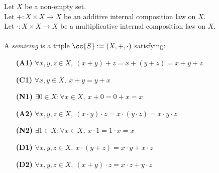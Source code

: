 \begin{definition-pre}[Semiring]
    \label{def:semiring}
    Let \(X\) be a non-empty set. \\
    Let \(+: X\times X \to X\) be an additive internal composition law on \(X\). \\
    Let \(\cdot: X\times X \to X\) be a multiplicative internal composition law on \(X\). \\\\
    A \textit{semiring} is a triple \(\cc{S}:= (X, +, \cdot)\) satisfying:
    \begin{enumerate}
        \item [\textbf{(A1)}] \(\forall x,y,z\in X,\ (x+y)+z= x+(y+z) = x+y+z\)
        \item [\textbf{(C1)}] \(\forall x,y\in X,\ x+y = y+x\)
        \item [\textbf{(N1)}] \(\exists 0 \in X : \forall x \in X,\ x+0 = 0+x = x\)
        \item [\textbf{(A2)}] \(\forall x,y,z\in X,\ (x\cdot y)\cdot z= x\cdot(y\cdot z) = x\cdot y\cdot z\)
        \item [\textbf{(N2)}] \(\exists 1 \in X : \forall x \in X,\ x\cdot1 = 1\cdot x = x\)
        \item [\textbf{(D1)}] \(\forall x,y,z \in X,\ x\cdot(y+z)=x\cdot y+x\cdot z\)
        \item [\textbf{(D2)}] \(\forall x,y,z \in X,\ (x+y)\cdot z=x\cdot z+y\cdot z\)
    \end{enumerate}
\end{definition-pre}
